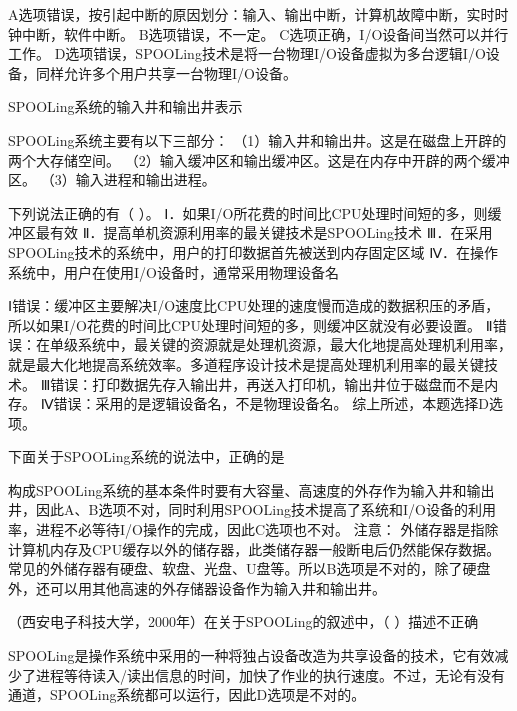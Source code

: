 \begin{solution}A选项错误，按引起中断的原因划分：输入、输出中断，计算机故障中断，实时时钟中断，软件中断。
B选项错误，不一定。 C选项正确，I/O设备间当然可以并行工作。
D选项错误，SPOOLing技术是将一台物理I/O设备虚拟为多台逻辑I/O设备，同样允许多个用户共享一台物理I/O设备。
\end{solution}
\question SPOOLing系统的输入井和输出井表示
\par{}
\begin{solution}SPOOLing系统主要有以下三部分：
（1）输入井和输出井。这是在磁盘上开辟的两个大存储空间。
（2）输入缓冲区和输出缓冲区。这是在内存中开辟的两个缓冲区。
（3）输入进程和输出进程。
\end{solution}
\question 下列说法正确的有（ ）。
Ⅰ．如果I/O所花费的时间比CPU处理时间短的多，则缓冲区最有效
Ⅱ．提高单机资源利用率的最关键技术是SPOOLing技术
Ⅲ．在采用SPOOLing技术的系统中，用户的打印数据首先被送到内存固定区域
Ⅳ．在操作系统中，用户在使用I/O设备时，通常采用物理设备名
\par{}
\begin{solution}Ⅰ错误：缓冲区主要解决I/O速度比CPU处理的速度慢而造成的数据积压的矛盾，所以如果I/O花费的时间比CPU处理时间短的多，则缓冲区就没有必要设置。
Ⅱ错误：在单级系统中，最关键的资源就是处理机资源，最大化地提高处理机利用率，就是最大化地提高系统效率。多道程序设计技术是提高处理机利用率的最关键技术。
Ⅲ错误：打印数据先存入输出井，再送入打印机，输出井位于磁盘而不是内存。
Ⅳ错误：采用的是逻辑设备名，不是物理设备名。 综上所述，本题选择D选项。
\end{solution}
\question 下面关于SPOOLing系统的说法中，正确的是
\par{}
\begin{solution}构成SPOOLing系统的基本条件时要有大容量、高速度的外存作为输入井和输出井，因此A、B选项不对，同时利用SPOOLing技术提高了系统和I/O设备的利用率，进程不必等待I/O操作的完成，因此C选项也不对。
注意：
外储存器是指除计算机内存及CPU缓存以外的储存器，此类储存器一般断电后仍然能保存数据。常见的外储存器有硬盘、软盘、光盘、U盘等。所以B选项是不对的，除了硬盘外，还可以用其他高速的外存储器设备作为输入井和输出井。
\end{solution}
\question （西安电子科技大学，2000年）在关于SPOOLing的叙述中，（ ）描述不正确
\par{}
\begin{solution}SPOOLing是操作系统中采用的一种将独占设备改造为共享设备的技术，它有效减少了进程等待读入/读出信息的时间，加快了作业的执行速度。不过，无论有没有通道，SPOOLing系统都可以运行，因此D选项是不对的。
\end{solution}
